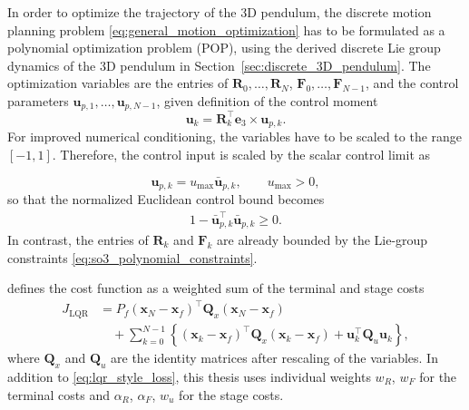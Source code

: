 In order to optimize the trajectory of the 3D pendulum, the discrete motion planning 
problem \eqref{eq:general_motion_optimization} has to be formulated as a 
polynomial optimization problem (POP), using the derived discrete Lie group dynamics of the
3D pendulum in Section~\ref{sec:discrete_3D_pendulum}. The optimization variables are the entries of
\(\bm{R}_0,\ldots,\bm{R}_N\), \(\bm{F}_0,\ldots,\bm{F}_{N-1}\), and the control parameters
\(\bm{u}_{p,1},\ldots,\bm{u}_{p,N-1}\), given \cite{Lee2008} definition of the control moment
\begin{equation}
    \bm{u}_k=\bm{R}_k^{\top}\bm{e}_3\times \bm{u}_{p,k}.
\end{equation}
For improved numerical conditioning, the variables have to be scaled to the range \([-1,1]\). 
Therefore, the control input is scaled by the scalar control limit as

\begin{equation}
    \bm{u}_{p,k}
    =u_{\max}\bar{\bm{u}}_{p,k},
    \qquad
    u_{\max}>0,
    \label{eq:u_scaling_3d_pendulum}
\end{equation}
so that the normalized Euclidean control bound becomes
\begin{align}\label{eq:u_bound_3d_pendulum}
    1-\bar{\bm{u}}_{p,k}^{\top}\bar{\bm{u}}_{p,k}\geq0.
\end{align}
In contrast, the entries of \(\bm{R}_k\) and \(\bm{F}_k\) are already bounded by the Lie-group constraints 
\eqref{eq:so3_polynomial_constraints}.

\cite{Kang_2026Fast} defines the cost function as a weighted sum of the terminal and stage costs 
\begin{equation}
    \begin{aligned}
    J_{\mathrm{LQR}}
    &=
    P_f
    \left(\bm{x}_N-\bm{x}_f\right)^\top
    \bm{Q}_x
    \left(\bm{x}_N-\bm{x}_f\right)
    \\
    &\quad+
    \sum_{k=0}^{N-1}
    \left\{
    \left(\bm{x}_k-\bm{x}_f\right)^\top
    \bm{Q}_x
    \left(\bm{x}_k-\bm{x}_f\right)
    +
    \bm{u}_k^\top \bm{Q}_u \bm{u}_k
    \right\},
    \end{aligned}
    \label{eq:lqr_style_loss}
\end{equation}
where $\bm{Q}_x$ and $\bm{Q}_u$ are the identity matrices after rescaling of the variables. 
In addition to \eqref{eq:lqr_style_loss}, this thesis uses individual weights $w_R$, $w_F$ for
the terminal costs and $\alpha_R$, $\alpha_F$, $w_u$ for
the stage costs.  

